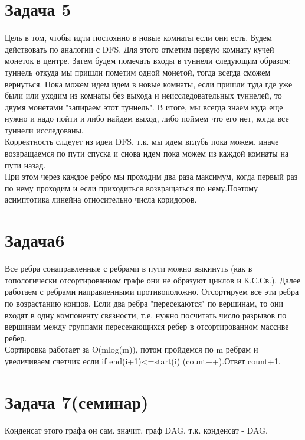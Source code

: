 \documentclass[a4paper,12pt]{article} %
\begin{document}
\section*{Задача 5}
Цель в том, чтобы идти постоянно в новые комнаты если они есть. Будем действовать по аналогии с DFS. Для этого отметим первую комнату кучей монеток в центре. Затем будем помечать входы в туннели следующим образом: туннель откуда мы пришли пометим одной монетой, тогда всегда сможем вернуться. Пока можем идем идем в новые комнаты, если пришли туда где уже были или уходим из комнаты без выхода и неисследовательных туннелей, то двумя монетами "запираем этот туннель". В итоге, мы всегда знаем куда еще нужно и надо пойти и либо найдем выход, либо поймем что его нет, когда все туннели исследованы.\\
Корректность слдеует из идеи DFS, т.к. мы идем вглубь пока можем, иначе возвращаемся по пути спуска и снова идем пока можем из каждой комнаты на пути назад.\\
При этом через каждое ребро мы проходим два раза максимум, когда первый раз по нему проходим и если приходиться возвращаться по нему.Поэтому асимптотика линейна относительно числа коридоров.\\


\section*{Задача6}
Все ребра сонаправленные с ребрами в пути можно выкинуть (как в топологически отсортированном графе они не образуют циклов и К.С.Св.). Далее работаем с ребрами направленными противоположно. 
Отсортируем все эти ребра по возрастанию концов.
Если два ребра "пересекаются" по вершинам, то они входят в одну компоненту связности, т.е. нужно  посчитать число разрывов по вершинам между группами пересекающихся ребер в отсортированном массиве ребер. \\
Сортировка работает за O(mlog(m)), потом пройдемся по m ребрам и увеличиваем счетчик если if end(i+1)<=start(i) (count++).Ответ count+1.\\




\section*{Задача 7(семинар)}
Конденсат этого графа он сам. значит, граф DAG, т.к. конденсат - DAG.
\end{document}
